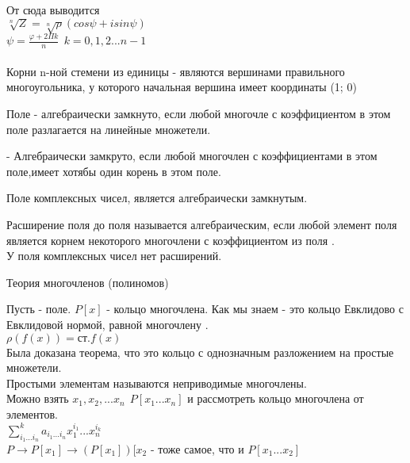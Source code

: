 От сюда выводится  \\
$\sqrt[n]{Z} = \sqrt[n]{\rho} (cos\psi + isin\psi)$ \\
$\psi = \frac {\varphi + 2\Pi k}{n} ~~ k = 0, 1, 2 ... n -1$ \\

 \\
Корни n-ной стемени из единицы - являются вершинами
правильного многоугольника, у которого начальная вершина
имеет координаты (1; 0) \\

\begin{defin}
	Поле  - алгебраически замкнуто, если любой многочле с
	коэффициентом в этом поле разлагается на линейные множетели.
\end{defin}

\begin{defin}
	 - Алгебраически замкруто, если любой многочлен с коэффициентами в этом
	поле,имеет хотябы один корень в этом поле.
\end{defin}

\begin{theorem}
	Поле комплексных чисел, является алгебраически замкнутым.
\end{theorem}

\begin{defin}
	Расширение поля  до поля  называется алгебраическим, если любой
	элемент поля  является корнем некоторого многочлени с коэффициентом из
	поля .\\
	У поля комплексных чисел нет расширений.
\end{defin}

\begin{title}
	Теория многочленов (полиномов)
\end{title}

Пусть  - поле. $P[x]$ - кольцо многочлена. Как мы знаем - это кольцо
Евклидово с Евклидовой нормой, равной многочлену . \\
$\rho (f(x)) = ст.f(x)$ \\
Была доказана теорема, что это кольцо с однозначным разложением на простые
множетели. \\
Простыми элементам называются неприводимые многочлены. \\
Можно взять $x_{1}, x_{2}, ... x_{n} ~~ P[x_{1} ... x_{n}]$ и рассмотреть кольцо
многочлена от  элементов. \\
$\sum_{i_{1}...i_{n}}^k a_{i_{1}...i_{n}} x_{1}^{i_{1}} ... x_{n}^{i_{k}}$ \\
$P \to P[x_{1}] \to (P[x_{1}])[x_{2}$ - тоже самое, что и $P[x_{1} ... x_{2}]$\\

